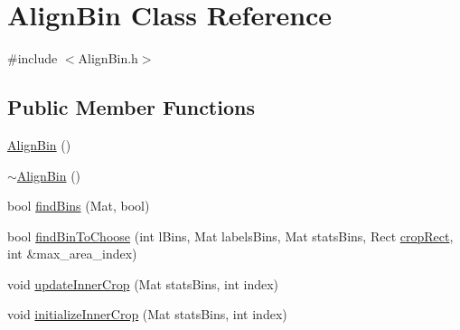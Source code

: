 \hypertarget{classAlignBin}{}\section{Align\+Bin Class Reference}
\label{classAlignBin}


{\ttfamily \#include $<$Align\+Bin.\+h$>$}

\subsection*{Public Member Functions}
\begin{DoxyCompactItemize}
\item 
\hyperlink{classAlignBin_a26fa4825f5622fa0448735154ec4366a}{Align\+Bin} ()
\item 
\hyperlink{classAlignBin_a9c29537d13848018a211141798f40e58}{$\sim$\+Align\+Bin} ()
\item 
bool \hyperlink{classAlignBin_a7b952f6038c2c39e23284d1fe37988b6}{find\+Bins} (Mat, bool)
\item 
bool \hyperlink{classAlignBin_a7b178f98348112e3648f260bfcb4528d}{find\+Bin\+To\+Choose} (int l\+Bins, Mat labels\+Bins, Mat stats\+Bins, Rect \hyperlink{BinsTask_8cpp_a5e48b467c036f0138a4336c5f73dd0ef}{crop\+Rect}, int \&max\+\_\+area\+\_\+index)
\item 
void \hyperlink{classAlignBin_a7f071885a59bf92b4f84a3d7ed94d3fa}{update\+Inner\+Crop} (Mat stats\+Bins, int index)
\item 
void \hyperlink{classAlignBin_a1b74035bb712d1b2337f8b07c1096d08}{initialize\+Inner\+Crop} (Mat stats\+Bins, int index)
\end{DoxyCompactItemize}
